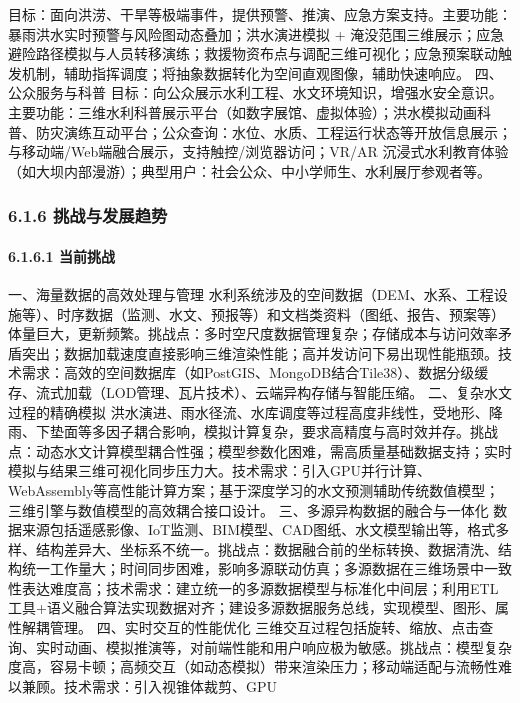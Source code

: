 目标：面向洪涝、干旱等极端事件，提供预警、推演、应急方案支持。主要功能：暴雨洪水实时预警与风险图动态叠加；洪水演进模拟 + 淹没范围三维展示；应急避险路径模拟与人员转移演练；救援物资布点与调配三维可视化；应急预案联动触发机制，辅助指挥调度；将抽象数据转化为空间直观图像，辅助快速响应。 四、公众服务与科普 目标：向公众展示水利工程、水文环境知识，增强水安全意识。主要功能：三维水利科普展示平台（如数字展馆、虚拟体验）；洪水模拟动画科普、防灾演练互动平台；公众查询：水位、水质、工程运行状态等开放信息展示；与移动端/Web端融合展示，支持触控/浏览器访问；VR/AR 沉浸式水利教育体验（如大坝内部漫游）；典型用户：社会公众、中小学师生、水利展厅参观者等。 \subsubsection{6.1.6 挑战与发展趋势}\label{ux6311ux6218ux4e0eux53d1ux5c55ux8d8bux52bf} \paragraph{6.1.6.1 当前挑战}\label{ux5f53ux524dux6311ux6218} 一、海量数据的高效处理与管理 水利系统涉及的空间数据（DEM、水系、工程设施等）、时序数据（监测、水文、预报等）和文档类资料（图纸、报告、预案等）体量巨大，更新频繁。挑战点：多时空尺度数据管理复杂；存储成本与访问效率矛盾突出；数据加载速度直接影响三维渲染性能；高并发访问下易出现性能瓶颈。技术需求：高效的空间数据库（如PostGIS、MongoDB结合Tile38）、数据分级缓存、流式加载（LOD管理、瓦片技术）、云端异构存储与智能压缩。 二、复杂水文过程的精确模拟 洪水演进、雨水径流、水库调度等过程高度非线性，受地形、降雨、下垫面等多因子耦合影响，模拟计算复杂，要求高精度与高时效并存。挑战点：动态水文计算模型耦合性强；模型参数化困难，需高质量基础数据支持；实时模拟与结果三维可视化同步压力大。技术需求：引入GPU并行计算、WebAssembly等高性能计算方案；基于深度学习的水文预测辅助传统数值模型；三维引擎与数值模型的高效耦合接口设计。 三、多源异构数据的融合与一体化 数据来源包括遥感影像、IoT监测、BIM模型、CAD图纸、水文模型输出等，格式多样、结构差异大、坐标系不统一。挑战点：数据融合前的坐标转换、数据清洗、结构统一工作量大；时间同步困难，影响多源联动仿真；多源数据在三维场景中一致性表达难度高；技术需求：建立统一的多源数据模型与标准化中间层；利用ETL工具+语义融合算法实现数据对齐；建设多源数据服务总线，实现模型、图形、属性解耦管理。 四、实时交互的性能优化 三维交互过程包括旋转、缩放、点击查询、实时动画、模拟推演等，对前端性能和用户响应极为敏感。挑战点：模型复杂度高，容易卡顿；高频交互（如动态模拟）带来渲染压力；移动端适配与流畅性难以兼顾。技术需求：引入视锥体裁剪、GPU 